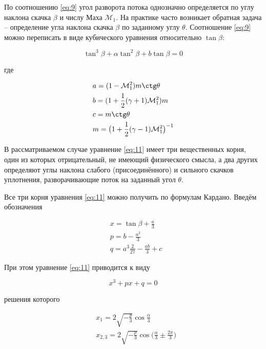 \documentclass[12pt,a4paper,oneside]{book}
\newcommand*\Mach{\mathcal{M}}
\begin{document}
  По соотношению \eqref{eq:9} угол разворота потока однозначно определяется
  по углу наклона скачка $\beta$ и числу Маха $\Mach_1$. На практике часто
  возникает обратная задача -- определение угла наклона скачка $\beta$
  по заданному углу $\theta$. Соотношение \eqref{eq:9} можно переписать
  в виде кубического уравнения относительно $\tan \beta$:
  
  \begin{equation}
    \label{eq:11}
    \tan^3 \beta + \alpha \tan^2 \beta + b \tan \beta = 0
  \end{equation}
  
  \noindent где
  
  \begin{align*}
    & a = (1 - \Mach_1^2) m \ctg \theta \\
    & b = (1 + \frac{1}{2} (\gamma + 1) \Mach_1^2) m \\
    & c = m \ctg \theta \\
    & m = \big( 1 + \frac{1}{2}(\gamma - 1) \Mach_1^2 \big)^{-1}
  \end{align*}
  
  В рассматриваемом случае уравнение \eqref{eq:11} имеет три вещественных
  корня, один из которых отрицательный, не имеющий физического смысла,
  а два других определяют углы наклона слабого (присоединённого) и сильного
  скачков уплотнения, разворачивающие поток на заданный угол $\theta$.
  
  Все три корня уравнения \eqref{eq:11} можно получить по формулам Кардано.
  Введём обозначения
  
  \begin{align*}
    & x = \tan \beta + \frac{a}{3} \\
    & p = b - \frac{a^2}{3} \\
    & q = a^3 \frac{2}{27} - \frac{ab}{3} + c
  \end{align*}
  
  \noindent При этом уравнение \eqref{eq:11} приводится к виду
  
  \begin{equation*}
    x^3 + px + q = 0
  \end{equation*}
  
  \noindent решения которого
  
  \begin{equation}
    \label{eq:12}
    \begin{split}
      & x_1 = 2 \sqrt{ -\frac{p}{3} } \cos \frac{\alpha}{3} \\
      & x_{2,3} = 2 \sqrt{-\frac{p}{3}}
        \cos \big( \frac{\alpha}{3} \pm \frac{2 \pi}{3} \big)
    \end{split}
  \end{equation}
  
\end{document}
